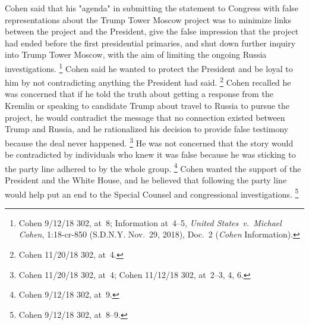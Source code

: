 Cohen said that his "agenda" in submitting the statement to Congress with false representations about the Trump Tower Moscow project was to minimize links between the project and the President, give the false impression that the project had ended before the first presidential primaries, and shut down further inquiry into Trump Tower Moscow, with the aim of limiting the ongoing Russia investigations.%
\footnote{Cohen 9/12/18 302, at~8;
Information at~4--5, \textit{United States~v.\ Michael Cohen}, 1:18-cr-850 (S.D.N.Y. Nov.~29, 2018), Doc.~2 (\textit{Cohen} Information).}
Cohen said he wanted to protect the President and be loyal to him by not contradicting anything the President had said.%
\footnote{Cohen 11/20/18 302, at~4.}
Cohen recalled he was concerned that if he told the truth about getting a response from the Kremlin or speaking to candidate Trump about travel to Russia to pursue the project, he would contradict the message that no connection existed between Trump and Russia, and he rationalized his decision to provide false testimony because the deal never happened.%
\footnote{Cohen 11/20/18 302, at~4;
Cohen 11/12/18 302, at~2--3, 4, 6.}
He was not concerned that the story would be contradicted by individuals who knew it was false because he was sticking to the party line adhered to by the whole group.%
\footnote{Cohen 9/12/18 302, at~9.}
Cohen wanted the support of the President and the White House, and he believed that following the party line would help put an end to the Special Counsel and congressional investigations.%
\footnote{Cohen 9/12/18 302, at~8--9.}

